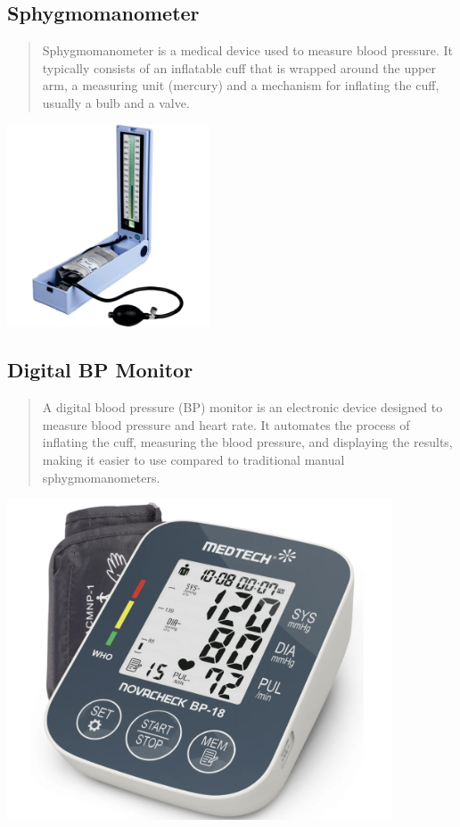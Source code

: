 \documentclass[
  11pt,
  letterpaper,
  DIV=11,
  numbers=noendperiod]{scrreprt}
\begin{document}
\subsection{Sphygmomanometer}\label{sphygmomanometer}

\begin{quote}
Sphygmomanometer is a medical device used to measure blood pressure. It
typically consists of an inflatable cuff that is wrapped around the
upper arm, a measuring unit (mercury) and a mechanism for inflating the
cuff, usually a bulb and a valve.
\end{quote}

\begin{center}
\includegraphics[width=0.45\textwidth,height=\textheight]{images/pngegg.png}
\end{center}

\subsection{Digital BP Monitor}\label{digital-bp-monitor}

\begin{quote}
A digital blood pressure (BP) monitor is an electronic device designed
to measure blood pressure and heart rate. It automates the process of
inflating the cuff, measuring the blood pressure, and displaying the
results, making it easier to use compared to traditional manual
sphygmomanometers.
\end{quote}

\begin{center}
\includegraphics[width=4.5in,height=\textheight]{images/clipboard-3151283748.png}
\end{center}
\end{document}

